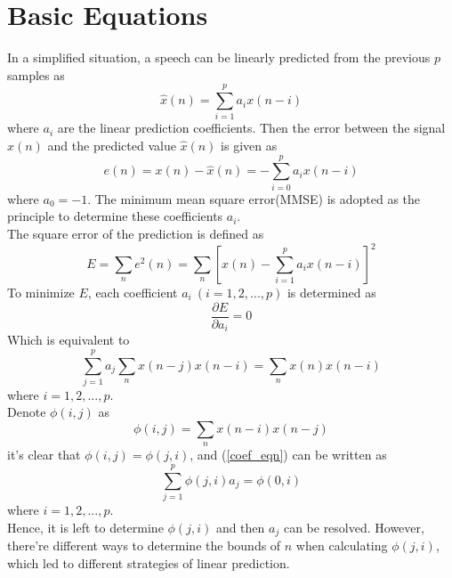 \documentclass[preprint,12pt]{elsarticle}
\begin{document}
\section{Basic Equations}
\label{S:1}
In a simplified situation, a speech can be linearly predicted from the previous $p$ samples as
\begin{equation}
	\hat{x}(n) =  \sum_{i=1}^{p} a_i x(n-i)
\end{equation}
where $a_i$ are the linear prediction coefficients. Then the error between the signal $x(n)$ and the predicted value $\hat{x}(n)$ is given as
\begin{equation}
	e(n) = x(n) - \hat{x}(n) = -\sum_{i=0}^{p}a_i x(n-i)
\end{equation}
where $a_0 = -1$. The minimum mean square error(MMSE) is adopted as the principle to determine these coefficients $a_i$.\\
The square error of the prediction is defined as
\begin{equation}
	E = \sum_{n}e^2(n) = \sum_{n}[x(n) - \sum_{i=1}^{p}a_i x(n-i)]^2
\end{equation}
To minimize $E$, each coefficient $a_i\ (i = 1, 2, ..., p)$ is determined as
\begin{equation}
	\frac{\partial E}{\partial a_i} = 0
\end{equation}
Which is equivalent to
\begin{equation}\label{coef_eqn}
	\sum_{j=1}^{p}a_j \sum_{n}x(n-j)x(n-i) = \sum_{n}x(n)x(n-i)
\end{equation}
where $i= 1, 2, ..., p$. \\
Denote $\phi(i,j)$ as
\begin{equation}\label{phi_def}
	\phi(i, j) = \sum_{n}x(n-i)x(n-j) 
\end{equation}
it's clear that $\phi(i,j) = \phi(j, i)$, and (\ref{coef_eqn}) can be written as
\begin{equation}
	\sum_{j=1}^{p} \phi(j, i)a_j = \phi(0, i)
\end{equation}
where $i= 1, 2, ..., p$.\\
Hence, it is left to determine $\phi(j, i)$ and then $a_j$ can be resolved. However, there're different ways to determine the bounds of $n$ when calculating $\phi(j, i)$, which led to different strategies of linear prediction.
\end{document}
